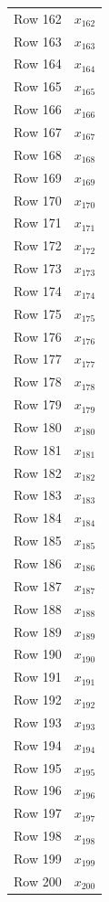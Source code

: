 \documentclass{article}
\begin{document}
\begin{longtable}{lr}
Row 162 & $x_{162}$ \\
Row 163 & $x_{163}$ \\
Row 164 & $x_{164}$ \\
Row 165 & $x_{165}$ \\
Row 166 & $x_{166}$ \\
Row 167 & $x_{167}$ \\
Row 168 & $x_{168}$ \\
Row 169 & $x_{169}$ \\
Row 170 & $x_{170}$ \\
Row 171 & $x_{171}$ \\
Row 172 & $x_{172}$ \\
Row 173 & $x_{173}$ \\
Row 174 & $x_{174}$ \\
Row 175 & $x_{175}$ \\
Row 176 & $x_{176}$ \\
Row 177 & $x_{177}$ \\
Row 178 & $x_{178}$ \\
Row 179 & $x_{179}$ \\
Row 180 & $x_{180}$ \\
Row 181 & $x_{181}$ \\
Row 182 & $x_{182}$ \\
Row 183 & $x_{183}$ \\
Row 184 & $x_{184}$ \\
Row 185 & $x_{185}$ \\
Row 186 & $x_{186}$ \\
Row 187 & $x_{187}$ \\
Row 188 & $x_{188}$ \\
Row 189 & $x_{189}$ \\
Row 190 & $x_{190}$ \\
Row 191 & $x_{191}$ \\
Row 192 & $x_{192}$ \\
Row 193 & $x_{193}$ \\
Row 194 & $x_{194}$ \\
Row 195 & $x_{195}$ \\
Row 196 & $x_{196}$ \\
Row 197 & $x_{197}$ \\
Row 198 & $x_{198}$ \\
Row 199 & $x_{199}$ \\
Row 200 & $x_{200}$ \\
\bottomrule
\end{longtable}
\end{document}
